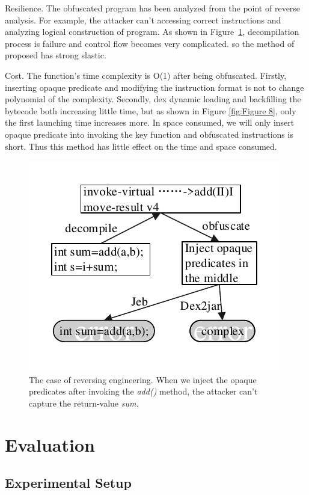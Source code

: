 Resilience. The obfuscated program has been analyzed from the point of reverse analysis. For example, the attacker can't accessing correct instructions and analyzing logical construction of program. As shown in Figure~\ref{fig:Figure 7}, decompilation process is failure and control flow becomes very complicated. so the method of proposed has strong slastic.

Cost. The function's time complexity is O(1) after being obfuscated. Firstly, inserting opaque predicate and modifying the instruction format is not to change polynomial of the complexity. Secondly, dex dynamic loading and backfilling the bytecode both increasing little time, but as shown in Figure \ref{fig:Figure 8}, only the first launching time increases more. In space consumed, we will only insert opaque predicate into invoking the key function and obfuscated instructions is short. Thus this method has little effect on the time and space consumed.


\begin{figure}[!tbp]
  \centering
  \includegraphics[width=0.8\columnwidth]{fig/fig7.pdf}
  \caption{The case of reversing engineering. When we inject the opaque predicates after invoking the \emph{add()} method, the attacker can't capture the return-value \emph{sum.}}\label{fig:Figure 7}
\end{figure}
\section{Evaluation}

\subsection{Experimental Setup}
